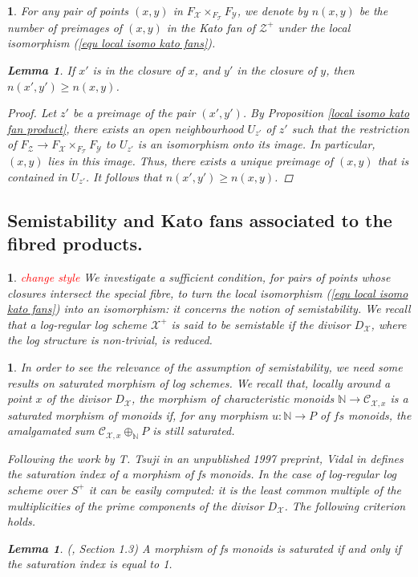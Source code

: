 \documentclass{amsart}%
\numberwithin{equation}{subsection}
\theoremstyle{plain2}
\newtheorem{lemma}[equation]{Lemma}
\theoremstyle{definition2}
\theoremstyle{stepstyle}
\theoremstyle{point}
\theoremstyle{subpoint}
\newtheorem{subpoint}[equation]{}%
\newcommand{\spa}[1]{\begin{subpoint}#1\end{subpoint}}           %
\newcommand{\N}{\ensuremath{\mathbb{N}}}
\newcommand{\cX}{\ensuremath{\mathscr{X}}}
\newcommand{\caC}{\ensuremath{\mathcal{C}}}
\newcommand{\cY}{\ensuremath{\mathscr{Y}}}
\newcommand{\cZ}{\ensuremath{\mathscr{Z}}}
\renewcommand{\cZ}{\ensuremath{\mathscr{Z}}}
\renewcommand{\cY}{\ensuremath{\mathscr{Y}}}
\begin{document}
\spa{For any pair of points $(x,y)$ in $F_\cX \times_{F_{\mathscr{T}}} F_\cY$, we denote by $n(x,y)$ be the number of preimages of $(x,y)$ in the Kato fan of $\cZ^+$ under the local isomorphism (\ref{equ local isomo kato fans}).
\begin{lemma} \label{lemma number of preimages} If $x'$ is in the closure of $x$, and $y'$ in the closure of $y$, then $n(x',y')\geqslant n(x,y)$.
\end{lemma}
\begin{proof}
Let $z'$ be a preimage of the pair $(x',y')$. By Proposition \ref{local isomo kato fan product}, there exists an open neighbourhood $U_{z'}$ of $z'$ such that the restriction of $F_{\cZ} \rightarrow F_{\cX} \times_{F_\mathscr{T}} F_{\cY}$ to $U_{z'}$ is an isomorphism onto its image. In particular, $(x,y)$ lies in this image. Thus, there exists a unique preimage of $(x,y)$ that is contained in $U_{z'}$. It follows that $n(x',y')\geqslant n(x,y)$.
\end{proof}
}

\subsection{Semistability and Kato fans associated to the fibred products.} 
\spa{\textcolor{red}{change style} We investigate a sufficient condition, for pairs of points whose closures intersect the special fibre, to turn the local isomorphism (\ref{equ local isomo kato fans}) into an isomorphism: it concerns the notion of semistability. We recall that a log-regular log scheme $\cX^+$ is said to be semistable if the divisor $D_{\cX}$, where the log structure is non-trivial, is reduced.}

\spa{In order to see the relevance of the assumption of semistability, we need some results on saturated morphism of log schemes. We recall that, locally around a point $x$ of the divisor $D_{\cX}$, the morphism of characteristic monoids $\N \rightarrow \caC_{\cX,x}$ is a saturated morphism of monoids if, for any morphism $u: \N \rightarrow P$ of $fs$ monoids, the amalgamated sum $\caC_{\cX,x} \oplus_{\N} P$ is still saturated.

Following the work by T. Tsuji in an unpublished 1997 preprint, Vidal in \cite{Vidal} defines the saturation index of a morphism of \emph{fs} monoids. In the case of log-regular log scheme over $S^+$ it can be easily computed: it is the least common multiple of the multiplicities of the prime components of the divisor $D_{\cX}$. The following criterion holds.
\begin{lemma} \label{lemma criterion saturation}(\cite{Vidal}, Section 1.3)
A morphism of fs monoids is saturated if and only if the saturation index is equal to 1.
\end{lemma}
}
\end{document}
